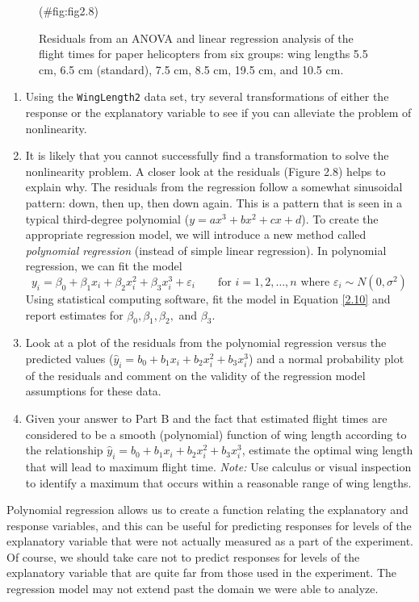 \documentclass[
]{report}
\begin{document}
\begin{list}{E..}{ \setlength{\itemsep}{1.2em}}
\begin{figure}
{}

\caption{Residuals from an ANOVA and linear regression analysis of the flight times for paper helicopters from six groups: wing lengths 5.5 cm, 6.5 cm (standard), 7.5 cm, 8.5 cm, 19.5 cm, and 10.5 cm.}(\#fig:fig2.8)
\end{figure}

    \begin{enumerate}
      \item Using the \texttt{WingLength2} data set, try several transformations of either the response or the explanatory variable to see if you can alleviate the problem of nonlinearity.
      \item It is likely that you cannot successfully find a transformation to solve the nonlinearity problem. A closer look at the residuals (Figure 2.8) helps to explain why. The residuals from the regression follow a somewhat sinusoidal pattern: down, then up, then down again. This is a pattern that is seen in a typical third-degree polynomial ($y = a x^3 + b x^2 + c x + d$). To create the appropriate regression model, we will introduce a new method called \textit{polynomial regression} (instead of simple linear regression). In polynomial regression, we can fit the model
      \[ \label{2.10}
        y_i = \beta_0 + \beta_1 x_i + \beta_2 x_i^2 + \beta_3 x_i^3 + \varepsilon_i \qquad \text{for } i = 1, 2, \ldots, n \text{ where } \varepsilon_i \sim N(0, \sigma^2)
        \tag{2.10}
      \]
      Using statistical computing software, fit the model in Equation \ref{2.10} and report estimates for $\beta_0, \beta_1, \beta_2,$ and $\beta_3$.
      \item Look at a plot of the residuals from the polynomial regression versus the predicted values ($\hat{y}_i = b_0 + b_1 x_i + b_2 x_i^2 + b_3 x_i^3$) and a normal probability plot of the residuals and comment on the validity of the regression model assumptions for these data.
      \item Given your answer to Part B and the fact that estimated flight times are considered to be a smooth (polynomial) function of wing length according to the relationship $\hat{y}_i = b_0 + b_1 x_i + b_2 x_i^2 + b_3 x_i^3$, estimate the optimal wing length that will lead to maximum flight time. \textit{Note:} Use calculus or visual inspection to identify a maximum that occurs within a reasonable range of wing lengths.
    \end{enumerate}

Polynomial regression allows us to create a function relating the explanatory and response variables, and this can be useful for predicting responses for levels of the explanatory variable that were not actually measured as a part of the experiment. Of course, we should take care not to predict responses for levels of the explanatory variable that are quite far from those used in the experiment. The regression model may not extend past the domain we were able to analyze.

\end{list}
\end{document}
